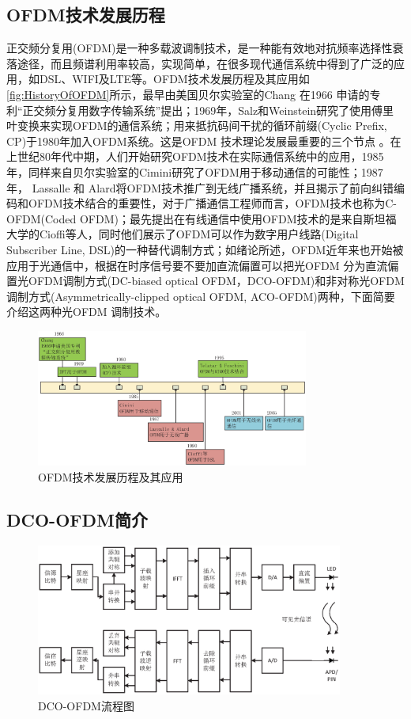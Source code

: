 \subsection{OFDM技术发展历程}
正交频分复用(OFDM)是一种多载波调制技术，是一种能有效地对抗频率选择性衰落途径，而且频谱利用率较高，实现简单，在很多现代通信系统中得到了广泛的应用，如DSL、WIFI及LTE等。OFDM技术发展历程及其应用如
\autoref{fig:HistoryOfOFDM}所示，最早由美国贝尔实验室的Chang 在1966 申请的专利“正交频分复用数字传输系统”提出；1969年，Salz和Weinstein研究了使用傅里叶变换来实现OFDM的通信系统；用来抵抗码间干扰的循环前缀(Cyclic Prefix, CP)于1980年加入OFDM系统。这是OFDM 技术理论发展最重要的三个节点
\cite{armstrong2009ofdm}。在上世纪80年代中期，人们开始研究OFDM技术在实际通信系统中的应用，1985年，同样来自贝尔实验室的Cimini研究了OFDM用于移动通信的可能性；1987年， Lassalle 和 Alard将OFDM技术推广到无线广播系统，并且揭示了前向纠错编码和OFDM技术结合的重要性，对于广播通信工程师而言，OFDM技术也称为C-OFDM(Coded OFDM)；最先提出在有线通信中使用OFDM技术的是来自斯坦福大学的Cioffi等人，同时他们展示了OFDM可以作为数字用户线路(Digital Subscriber Line, DSL)的一种替代调制方式；如绪论所述，OFDM近年来也开始被应用于光通信中，根据在时序信号要不要加直流偏置可以把光OFDM 分为直流偏置光OFDM调制方式(DC-biased optical OFDM，DCO-OFDM)和非对称光OFDM调制方式(Asymmetrically-clipped optical OFDM, ACO-OFDM)两种，下面简要介绍这两种光OFDM 调制技术。
\begin{figure}[htbp]
    \centering
    \includegraphics[width=0.8\textwidth]{figures/chapter-2/HistoryOfOFDM.eps}
    \caption{OFDM技术发展历程及其应用}
    \label{fig:HistoryOfOFDM}
\end{figure}
\subsection{DCO-OFDM简介}
\begin{figure}[htbp]
    \centering
    \includegraphics[width=0.9\textwidth]{figures/chapter-2/DCO-OFDMStructure.eps}
    \caption{DCO-OFDM流程图}
    \label{fig:DCO-OFDMStructure}
\end{figure}

